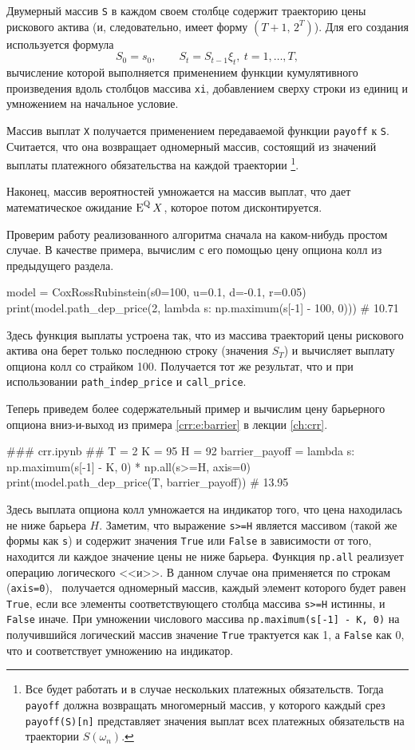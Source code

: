 Двумерный массив \verb"S" в каждом своем столбце содержит траекторию цены рискового актива (и, следовательно, имеет форму $(T+1,\, 2^T)$).
Для его создания используется формула
\[
S_0 = s_0, \qquad S_t = S_{t-1}\xi_t,\ t=1,\dots,T,
\]
вычисление которой выполняется применением функции кумулятивного произведения вдоль столбцов массива \verb"xi", добавлением сверху строки из единиц и умножением на начальное условие. 

Массив выплат \verb"X" получается применением передаваемой функции \verb"payoff" к \verb"S". Считается, что она возвращает одномерный массив, состоящий из значений выплаты платежного обязательства на каждой траектории%
\footnote{Все будет работать и в случае нескольких платежных обязательств.
Тогда \verb"payoff" должна возвращать многомерный массив, у которого каждый срез \verb"payoff(S)[n]" представляет значения выплат всех платежных обязательств на траектории $S(\omega_n)$.}.

Наконец, массив вероятностей умножается на массив выплат, что дает математическое ожидание $\operatorname{E}^{\mathrm{Q}} X$, которое потом дисконтируется.

Проверим работу реализованного алгоритма сначала на каком-нибудь простом случае.
В качестве примера, вычислим с его помощью цену опциона колл из предыдущего раздела.
\begin{python}
model = CoxRossRubinstein(s0=100, u=0.1, d=-0.1, r=0.05)
print(model.path_dep_price(2, lambda s: np.maximum(s[-1] - 100, 0)))  # 10.71
\end{python}
Здесь функция выплаты устроена так, что из массива траекторий цены рискового актива она берет только последнюю строку (значения $S_T$) и вычисляет выплату опциона колл со страйком 100.
Получается тот же результат, что и при использовании \verb"path_indep_price" и \verb"call_price".

Теперь приведем более содержательный пример и вычислим цену барьерного опциона вниз-и-выход из примера \ref{crr:e:barrier} в лекции \ref{ch:crr}.
\begin{python}
### crr.ipynb ##
T = 2
K = 95
H = 92
barrier_payoff = lambda s: np.maximum(s[-1] - K, 0) * np.all(s>=H, axis=0)
print(model.path_dep_price(T, barrier_payoff))  # 13.95
\end{python}
Здесь выплата опциона колл умножается на индикатор того, что цена находилась не ниже барьера $H$.
Заметим, что выражение \verb"s>=H" является массивом (такой же формы как \verb"s") и содержит значения \verb"True" или \verb"False" в зависимости от того, находится ли каждое значение цены не ниже барьера.
Функция \verb"np.all" реализует операцию логического <<и>>.
В данном случае она применяется по строкам (\verb"axis=0"), \te\ получается одномерный массив, каждый элемент которого будет равен \verb"True", если все элементы соответствующего столбца массива \verb"s>=H" истинны, и \verb"False" иначе.
При умножении числового массива \verb"np.maximum(s[-1] - K, 0)" на получившийся логический массив значение \verb"True" трактуется как 1, а \verb"False" как 0, что и соответствует умножению на индикатор.

